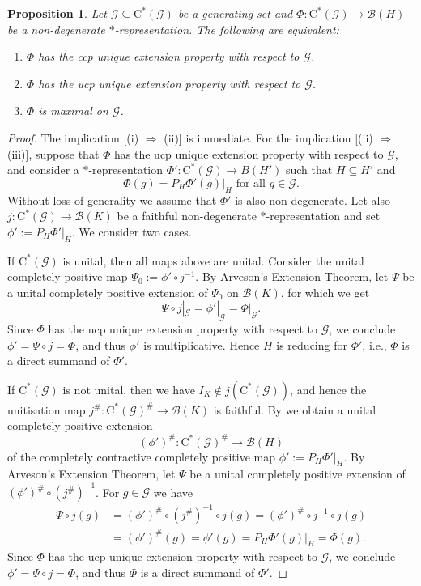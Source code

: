 \documentclass[11pt, draft]{amsart}
\numberwithin{equation}{section}
\theoremstyle{plain}
\newtheorem{proposition}[theorem]{Proposition}
\theoremstyle{definition}
\theoremstyle{remark}
\newcommand{\B}{{\mathcal{B}}}
\newcommand{\G}{{\mathcal{G}}}
\newcommand{\foral}{\text{ for all }}
\newcommand{\ca}{\mathrm{C}^*}
\begin{document}
\begin{proposition}\label{P:uepiffmax}
Let $\G\subseteq \ca(\G)$ be a generating set and $\Phi \colon \ca(\G) \to \B(H)$ be a non-degenerate $*$-representation. 
The following are equivalent:
\begin{enumerate}
\item $\Phi$ has the ccp unique extension property with respect to $\G$.
\item $\Phi$ has the ucp unique extension property with respect to $\G$.
\item $\Phi$ is maximal on $\G$.
\end{enumerate}
\end{proposition}

\begin{proof}
The implication [(i) $\Rightarrow$ (ii)] is immediate.
For the implication [(ii) $\Rightarrow$ (iii)], suppose that $\Phi$ has the ucp unique extension property with respect to $\G$, and consider a $*$-representation $\Phi' \colon \ca(\G)\to B(H')$ such that $H\subseteq H'$ and 
\[
\Phi(g)=P_H\Phi'(g)|_H \foral g\in \G.
\]
Without loss of generality we assume that $\Phi'$ is also non-degenerate.
Let also $j \colon \ca(\G) \to \B(K)$ be a faithful non-degenerate $*$-representation and set $\phi' := P_H \Phi'|_H$.
We consider two cases.

\smallskip

If $\ca(\G)$ is unital, then all maps above are unital.
Consider the unital completely positive map $\Psi_0 := \phi' \circ j^{-1}$.
By Arveson's Extension Theorem, let $\Psi$ be a unital completely positive extension of $\Psi_0$ on $\B(K)$, for which we get 
\[
\Psi \circ j|_\G = \phi'|_{\G} = \Phi|_{\G}.
\]
Since $\Phi$ has the ucp unique extension property with respect to $\G$, we conclude $\phi' = \Psi \circ j = \Phi$, and thus $\phi'$ is multiplicative.
Hence $H$ is reducing for $\Phi'$, i.e., $\Phi$ is a direct summand of $\Phi'$.

\smallskip

If $\ca(\G)$ is not unital, then we have $I_K \notin j(\ca(\G))$, and hence the unitisation map $j^\#\colon \ca(\G)^\#\to \B(K)$ is faithful.
By \cite[Proposition 2.2.1]{BO08} we obtain a unital completely positive extension 
\[
(\phi')^{\#}\colon \ca(\G)^\#\to \B(H)
\]
of the completely contractive completely positive map $\phi':=P_H\Phi'|_H$.
By Arveson's Extension Theorem, let $\Psi$ be a unital completely positive extension of $(\phi')^{\#} \circ (j^{\#})^{-1}$. 
For $g\in \G$ we have
\begin{align*}
\Psi\circ j(g) 
& = (\phi')^\#\circ (j^\#)^{-1}\circ j(g)
= (\phi')^\#\circ j^{-1}\circ j(g) \\
& = (\phi')^\#(g)
= \phi'(g)
= P_H\Phi'(g)|_H
= \Phi(g).
\end{align*}
Since $\Phi$ has the ucp unique extension property with respect to $\G$, we conclude $\phi' = \Psi \circ j = \Phi$, and thus $\Phi$ is a direct summand of $\Phi'$.


\end{proof}
\end{document}
